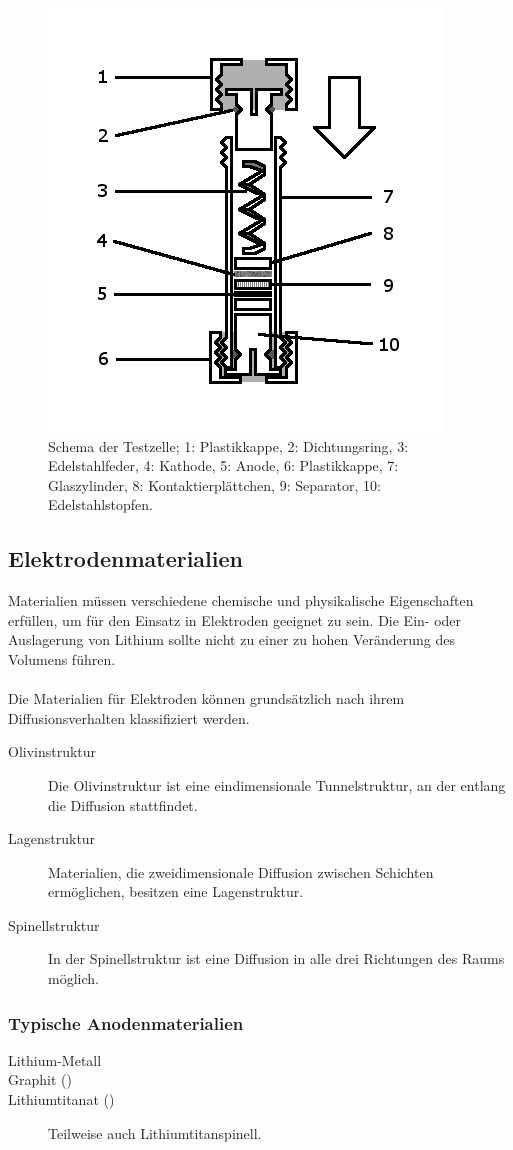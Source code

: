 \documentclass[a4paper, 11pt, headsepline,footsepline,twoside,abstract]{scrbook}
\begin{document}
\begin{figure}
	\centering
	\includegraphics[width=0.7\columnwidth]{images/Schema_Zelle.jpg}
	\caption{Schema der Testzelle; 
			1: Plastikkappe,
			2: Dichtungsring,
			3: Edelstahlfeder,
			4: Kathode,
			5: Anode,
			6: Plastikkappe,
			7: Glaszylinder,
			8: Kontaktierplättchen,
			9: Separator,
			10: Edelstahlstopfen.
			}
	\label{schema_zelle}
\end{figure}
\subsection{Elektrodenmaterialien}
Materialien müssen verschiedene chemische und physikalische Eigenschaften erfüllen, um für den Einsatz in Elektroden geeignet zu sein. Die Ein- oder Auslagerung von Lithium sollte nicht zu einer zu hohen Veränderung des Volumens führen.
\\\\
Die Materialien für Elektroden können grundsätzlich nach ihrem Diffusionsverhalten klassifiziert werden.
\begin{description}
\item[Olivinstruktur] Die Olivinstruktur ist eine eindimensionale Tunnelstruktur, an der entlang die Diffusion stattfindet.
\item[Lagenstruktur] Materialien, die zweidimensionale Diffusion zwischen Schichten ermöglichen, besitzen eine Lagenstruktur.
\item[Spinellstruktur] In der Spinellstruktur ist eine Diffusion in alle drei Richtungen des Raums möglich.
\end{description}
\subsubsection{Typische Anodenmaterialien}
\begin{description}
\item[Lithium-Metall]
\item[Graphit ()]
\item[Lithiumtitanat ()] Teilweise auch Lithiumtitanspinell.
\end{description}
\end{document}

